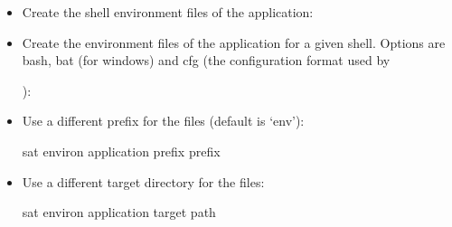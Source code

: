\documentclass[a4paper,10pt,english]{sphinxmanual}
\begin{document}
\label{\detokenize{commands/environ:usage}}\begin{itemize}
\item {} 
Create the shell environment files of the application:

%
\begin{sphinxVerbatim}[commandchars=\\\{\}]
  
\end{sphinxVerbatim}

\item {} 
Create the environment files of the application for a given shell.
Options are bash, bat (for windows) and cfg (the configuration format used by %
\begin{footnote}[11]\sphinxAtStartFootnote
{}
%
\end{footnote}):

%
\begin{sphinxVerbatim}[commandchars=\\\{\}]
    \PYG{p}{[}\PYG{p}{]}
\end{sphinxVerbatim}

\item {} 
Use a different prefix for the files (default is ‘env’):

%
\begin{sphinxVerbatim}[commandchars=\\\{\}]
sat environ \PYGZlt{}application\PYGZgt{} \PYGZhy{}\PYGZhy{}prefix \PYGZlt{}prefix\PYGZgt{}
\end{sphinxVerbatim}

\item {} 
Use a different target directory for the files:

%
\begin{sphinxVerbatim}[commandchars=\\\{\}]
sat environ \PYGZlt{}application\PYGZgt{} \PYGZhy{}\PYGZhy{}target \PYGZlt{}path\PYGZgt{}
\end{sphinxVerbatim}


\end{itemize}
\end{document}
